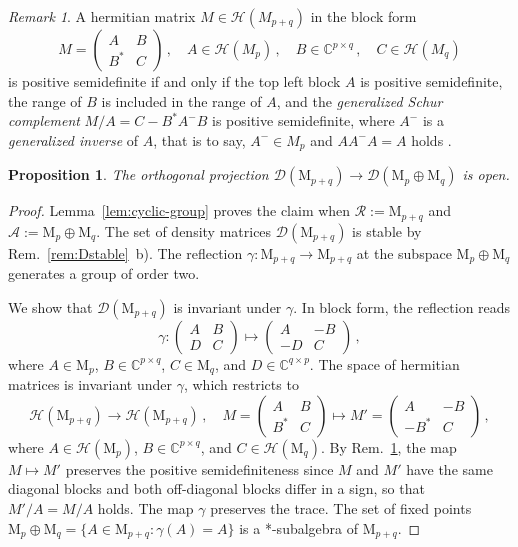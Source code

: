 \documentclass[a4paper,11pt,reqno]{amsart}
\newcommand{\C}{\mathbb{C}}
\newcommand{\M}{\mathrm{M}}
\newcommand{\cA}{\mathcal{A}}
\newcommand{\cD}{\mathcal{D}}
\newcommand{\cH}{\mathcal{H}}
\newcommand{\cR}{\mathcal{R}}
\newtheorem{prop}[thm]{Proposition}
\theoremstyle{definition}
\theoremstyle{remark}
\newtheorem{rem}[thm]{Remark}
\numberwithin{equation}{section}
\begin{document}
%
\begin{rem}\label{rem:Schur}
A hermitian matrix $M\in\cH(M_{p+q})$ in the block form
\[
M=\begin{pmatrix}
A & B\\
B^\ast & C
\end{pmatrix}\,,
\quad
A\in\cH(M_p)\,,
\quad
B\in\C^{p\times q}\,,
\quad
C\in\cH(M_q)
\]
is positive semidefinite if and only if the top left block $A$ is positive
semidefinite, the range of $B$ is included in the range of $A$, and the 
\emph{generalized Schur complement} $M/A=C-B^\ast A^-B$ is positive 
semidefinite, where $A^-$ is a \emph{generalized inverse} of $A$, that is 
to say, $A^-\in M_p$ and $AA^-A=A$ holds \cite{HornZhang2005}.
\end{rem}
%
\begin{prop}\label{pro:project-sum}
The orthogonal projection $\cD(\M_{p+q})\to\cD(\M_p\oplus\M_q)$ is open.
\end{prop}
%
\begin{proof}
Lemma~\ref{lem:cyclic-group} proves the claim when $\cR:=\M_{p+q}$ and 
$\cA:=\M_p\oplus\M_q$. The set of density matrices $\cD(\M_{p+q})$ is stable 
by Rem.~\ref{rem:Dstable}~b). The reflection $\gamma:\M_{p+q}\to\M_{p+q}$ at 
the subspace $\M_p\oplus\M_q$ generates a group of order two. 
\par
%
We show that $\cD(\M_{p+q})$ is invariant under $\gamma$. In block form, 
the reflection reads
\[\textstyle
\gamma:
\begin{pmatrix}
A & B\\
D & C
\end{pmatrix}
\mapsto
\begin{pmatrix}
A & -B\\
-D & C
\end{pmatrix}\,,
\]
where $A\in\M_p$, $B\in\C^{p\times q}$, $C\in\M_q$, and $D\in\C^{q\times p}$.
The space of hermitian matrices is invariant under $\gamma$, which restricts to 
\[\textstyle
\cH(\M_{p+q})\to\cH(\M_{p+q})\,,
\quad
M=\begin{pmatrix}
A & B\\
B^\ast & C
\end{pmatrix}
\mapsto
M'=\begin{pmatrix}
A & -B\\
-B^\ast & C
\end{pmatrix}\,,
\]
where $A\in\cH(\M_p)$, $B\in\C^{p\times q}$, and $C\in\cH(\M_q)$. By
Rem.~\ref{rem:Schur}, the map $M\mapsto M'$ preserves the positive 
semidefiniteness since $M$ and $M'$ have the same diagonal blocks and 
both off-diagonal blocks differ in a sign, so that $M'/A=M/A$ holds. 
The map $\gamma$ preserves the trace. The set of fixed points
$\M_p\oplus\M_q=\{A\in\M_{p+q}:\gamma(A)=A\}$ is a *-subalgebra of $\M_{p+q}$.
\end{proof}
\end{document}
